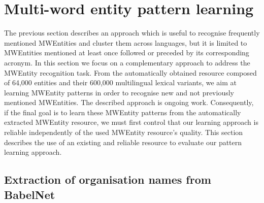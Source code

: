 \documentclass[output=paper]{langsci/langscibook}
\begin{document}
\section{Multi-word entity pattern learning}
\label{jac:chap10sec4}
The previous section describes an approach which is useful to recognise frequently mentioned MWEntities and cluster them across languages, but it is limited to MWEntities mentioned at least once followed or preceded by its corresponding acronym. In this section we focus on a complementary approach to address the MWEntity recognition task. From the automatically obtained resource composed of 64,000 entities and their 600,000 multilingual lexical variants, we aim at learning MWEntity patterns in order to recognise new and not previously mentioned MWEntities. The described approach is ongoing work. Consequently, if the final goal is to learn these MWEntity patterns from the automatically extracted MWEntity resource, we must first control that our learning approach is reliable independently of the used MWEntity resource's quality. This section describes the use of an existing and reliable resource to evaluate our pattern learning approach.

\subsection{Extraction of organisation names from BabelNet}
\label{jac:sec:babelnet}
\end{document}
